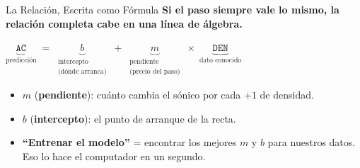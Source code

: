 \documentclass[aspectratio=169, 11pt]{beamer}
\begin{document}
\begin{frame}{La Relación, Escrita como Fórmula}
  \vspace{-6pt}
  {\small\color{arcaDark}\bfseries
    Si el paso siempre vale lo mismo, la relación completa cabe en una línea de álgebra.}

  \vspace{10pt}
  \centering
  {\large\color{arcaDark}
  \(
    \underbrace{\texttt{AC}}_{\text{predicción}}
    \;=\;
    \underbrace{b}_{\substack{\text{intercepto}\\ \text{(dónde arranca)}}}
    \;+\;
    \underbrace{m}_{\substack{\text{pendiente}\\ \text{(precio del paso)}}}
    \;\times\;
    \underbrace{\texttt{DEN}}_{\text{dato conocido}}
  \)
  }

  \vspace{12pt}
  {\footnotesize\color{textMuted}
  \begin{itemize}\setlength{\itemsep}{5pt}
    \item[{\color{arcaRed}\scriptsize\faArrowRight}]
      \(m\) (\textbf{pendiente}): cuánto cambia el sónico por cada \(+1\) de densidad.
    \item[{\color{arcaRed}\scriptsize\faArrowRight}]
      \(b\) (\textbf{intercepto}): el punto de arranque de la recta.
    \item[{\color{codeGreen}\scriptsize\faCheck}]
      \textbf{``Entrenar el modelo''} = encontrar los mejores \(m\) y \(b\) para nuestros
      datos. Eso lo hace el computador en un segundo.
  \end{itemize}
  }
\end{frame}
\end{document}
